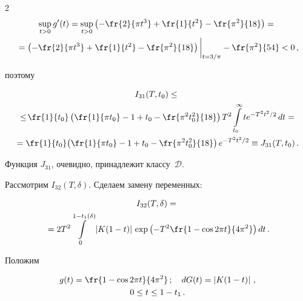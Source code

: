 \begin{multicols}{2}
\begin{multline*}
\sup_{t>0}g'(t)=\sup_{t>0}\left( -\fr{2}{\pi t^3} + \fr{1}{t^2}-


\fr{\pi^2}{18} \right)={}\\


{}= \left( -\fr{2}{\pi t^3} + \fr{1}{t^2}-


\fr{\pi^2}{18} \right)\bigg|_{t=3/\pi}


-\fr{\pi^2}{54}<0\,,


\end{multline*}


поэтому


\begin{multline*}


I_{31}(T,t_0)\le{}\\


{}\le


 \!\fr{1}{t_0}\left(\fr{1}{\pi


t_0}-1+t_0-\fr{\pi^2t_0^2}{18}\right) T^2\int\limits_{t_0}^\infty t e^{-T^2t^2/2}\,dt={}\\


\!{}= \fr{1}{t_0}\!\left(\fr{1}{\pi t_0}-1+ t_0-\fr{\pi^2t_0^2}{18}\right)e^{-T^2t^2/2}\equiv


J_{31}(T,t_0)\,.


\end{multline*}


Функция $J_{31}$, очевидно, принадлежит классу~$\mathcal D$.


\columnbreak





Рассмотрим $I_{32}(T,\delta).$ Сделаем замену переменных:


\begin{multline*}


I_{32}(T,\delta)={}\\


{}=


2T^2\!\int\limits_0^{1-t_1(\delta)}{|K(1-t)|\,\exp\left(-T^2\fr{1-\cos 2\pi


t}{4\pi^2}\right)}\,dt\,.


\end{multline*}


Положим


\begin{multline*}


g(t)=\fr{1-\cos 2\pi t}{4\pi^2}\,;\quad dG(t)=\left|K(1-t)\right|\,,\\


 0\le t\le1-t_1\,.



\end{multline*}
\end{multicols}
